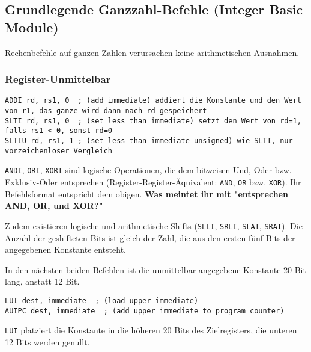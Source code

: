 \subsection{Grundlegende Ganzzahl-Befehle (Integer Basic Module)}

Rechenbefehle auf ganzen Zahlen verursachen keine arithmetischen Ausnahmen.

\subsubsection{Register-Unmittelbar}

\begin{lstlisting}[style=risc-v_Assembler]
ADDI rd, rs1, 0  ; (add immediate) addiert die Konstante und den Wert von r1, das ganze wird dann nach rd gespeichert
SLTI rd, rs1, 0  ; (set less than immediate) setzt den Wert von rd=1, falls rs1 < 0, sonst rd=0
SLTIU rd, rs1, 1 ; (set less than immediate unsigned) wie SLTI, nur vorzeichenloser Vergleich
\end{lstlisting}

\lstinline[style=risc-v_Assembler]!ANDI!, \lstinline[style=risc-v_Assembler]!ORI!, \lstinline[style=risc-v_Assembler]!XORI! sind logische Operationen, die dem bitweisen Und, Oder bzw. Exklusiv-Oder entsprechen (Register-Register-Äquivalent: \lstinline[style=risc-v_Assembler]!AND!, \lstinline[style=risc-v_Assembler]!OR! bzw. \lstinline[style=risc-v_Assembler]!XOR!). Ihr
Befehlsformat entspricht dem obigen. \textbf{Was meintet ihr mit "entsprechen AND, OR, und XOR?"}

Zudem existieren logische und arithmetische Shifts (\lstinline[style=risc-v_Assembler]!SLLI!, \lstinline[style=risc-v_Assembler]!SRLI!, \lstinline[style=risc-v_Assembler]!SLAI!, \lstinline[style=risc-v_Assembler]!SRAI!). Die Anzahl
der geshifteten Bits ist gleich der Zahl, die aus den ersten fünf Bits der angegebenen Konstante entsteht.

In den nächsten beiden Befehlen ist die unmittelbar angegebene Konstante 20 Bit lang, anstatt 12 Bit.

\begin{lstlisting}[style=risc-v_Assembler]
LUI dest, immediate  ; (load upper immediate)
AUIPC dest, immediate  ; (add upper immediate to program counter)
\end{lstlisting}

\lstinline[style=risc-v_Assembler]!LUI! platziert die Konstante in die höheren 20 Bits des Zielregisters, die unteren 12 Bits werden genullt.


